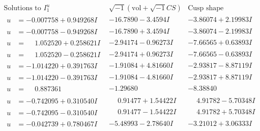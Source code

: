 \documentclass[1p]{elsarticle_modified}
\theoremstyle{definition}
\newcommand{\I}{\sqrt{-1}}
\begin{document}
$$\begin{array}{c|c|c}  
\text{Solutions to }I^u_{1}& \I (\text{vol} + \sqrt{-1}CS) & \text{Cusp shape}\\
 \hline 
\begin{aligned}
u &= -0.007758 + 0.949268 I\end{aligned}
 & -16.7890 - 3.4594 I & -3.86074 + 2.19983 I \\ \hline\begin{aligned}
u &= -0.007758 - 0.949268 I\end{aligned}
 & -16.7890 + 3.4594 I & -3.86074 - 2.19983 I \\ \hline\begin{aligned}
u &= \phantom{-}1.052520 + 0.258621 I\end{aligned}
 & -2.94174 - 0.96273 I & -7.66565 + 0.63893 I \\ \hline\begin{aligned}
u &= \phantom{-}1.052520 - 0.258621 I\end{aligned}
 & -2.94174 + 0.96273 I & -7.66565 - 0.63893 I \\ \hline\begin{aligned}
u &= -1.014220 + 0.391763 I\end{aligned}
 & -1.91084 + 4.81660 I & -2.93817 - 8.87119 I \\ \hline\begin{aligned}
u &= -1.014220 - 0.391763 I\end{aligned}
 & -1.91084 - 4.81660 I & -2.93817 + 8.87119 I \\ \hline\begin{aligned}
u &= \phantom{-}0.887361\phantom{ +0.000000I}\end{aligned}
 & -1.29680\phantom{ +0.000000I} & -8.38840\phantom{ +0.000000I} \\ \hline\begin{aligned}
u &= -0.742095 + 0.310540 I\end{aligned}
 & \phantom{-}0.91477 + 1.54422 I & \phantom{-}4.91782 - 5.70348 I \\ \hline\begin{aligned}
u &= -0.742095 - 0.310540 I\end{aligned}
 & \phantom{-}0.91477 - 1.54422 I & \phantom{-}4.91782 + 5.70348 I \\ \hline\begin{aligned}
u &= -0.042739 + 0.780467 I\end{aligned}
 & -5.48993 - 2.78640 I & -3.21012 + 3.06333 I \\ \hline\begin{aligned}

\end{aligned}
\end{array}$$
\end{document}
